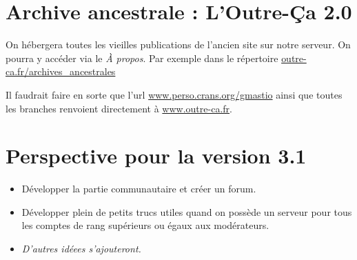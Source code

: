 \documentclass[french]{report}
\theoremstyle{plain}
\begin{document}
\chapter{Archive ancestrale : L'Outre-Ça 2.0}
	On hébergera toutes les vieilles publications de l'ancien site sur notre serveur. On pourra y accéder via le \emph{À propos}. Par exemple dans le répertoire \url{outre-ca.fr/archives_ancestrales}

	Il faudrait faire en sorte que l'url \url{www.perso.crans.org/gmastio} ainsi que toutes les branches renvoient directement à \url{www.outre-ca.fr}.


\chapter{Perspective pour la version 3.1}
	
	\begin{itemize}
		\item Développer la partie communautaire et créer un forum. 
		\item Développer plein de petits trucs utiles quand on possède un serveur pour tous les comptes de rang supérieurs ou égaux aux modérateurs.
		\item \emph{D'autres idéees s'ajouteront.}
	\end{itemize}
\end{document}
